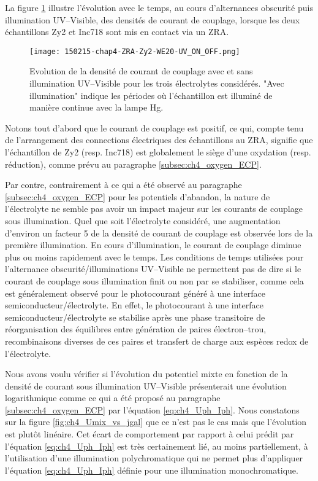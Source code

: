 \begin{refsection}
    La figure \ref{fig:ch4_ZRA_UV_ON_OFF} illustre l’évolution avec le temps, au cours d’alternances
    obscurité puis illumination UV--Visible, des
    densités de courant de couplage, lorsque les deux échantillons Zy2 et Inc718 sont mis en contact via un ZRA.

    \begin{figure}[H]
        \centering
        \texttt{[image: 150215-chap4-ZRA-Zy2-WE20-UV\_ON\_OFF.png]}
        \caption{Evolution de la densité de courant de couplage avec et sans illumination UV--Visible pour les trois
        électrolytes considérés. "Avec illumination" indique les périodes où l’échantillon est illuminé de manière
    continue avec la lampe Hg.}
        \label{fig:ch4_ZRA_UV_ON_OFF}
    \end{figure}

    Notons tout d’abord que le courant de couplage est positif, ce qui, compte tenu de l’arrangement des connections
    électriques des échantillons au ZRA, signifie que l’échantillon de Zy2 (resp. Inc718) est globalement le siège d’une
    oxydation (resp. réduction), comme prévu au paragraphe \ref{subsec:ch4_oxygen_ECP}.

    Par contre, contrairement à ce qui a été observé au paragraphe \ref{subsec:ch4_oxygen_ECP} pour les potentiels d’abandon, la nature de
    l’électrolyte ne semble pas avoir un impact majeur sur les courants de couplage sous illumination. Quel que soit
    l’électrolyte considéré, une augmentation d’environ un facteur 5 de la densité de courant de couplage est observée
    lors de la première illumination. En cours d’illumination, le courant de couplage diminue plus ou moins rapidement
    avec le temps. Les conditions de temps utilisées pour l’alternance obscurité/illuminations UV--Visible ne permettent
    pas de dire si le courant de couplage sous illumination finit ou non par se stabiliser, comme cela est généralement
    observé pour le photocourant généré à une interface semiconducteur/électrolyte. En effet, le photocourant à une
    interface semiconducteur/électrolyte se stabilise après une phase transitoire de réorganisation des équilibres entre
    génération de paires électron--trou, recombinaisons diverses de ces paires et transfert de charge aux espèces redox
    de l’électrolyte.

    Nous avons voulu vérifier si l’évolution du potentiel mixte en fonction de la densité de courant sous illumination
    UV--Visible présenterait une évolution logarithmique comme ce qui a été proposé au paragraphe \ref{subsec:ch4_oxygen_ECP}
    par l’équation \ref{eq:ch4_Uph_Iph}.
    Nous constatons sur la figure \ref{fig:ch4_Umix_vs_jgal} que ce n’est pas le cas mais que l’évolution est plutôt linéaire. Cet écart de
    comportement par rapport à celui prédit par l’équation \ref{eq:ch4_Uph_Iph} est très certainement lié, au moins
    partiellement, à l’utilisation d’une illumination
    polychromatique qui ne permet plus d’appliquer l’équation \ref{eq:ch4_Uph_Iph} définie pour une illumination monochromatique.


\end{refsection}
